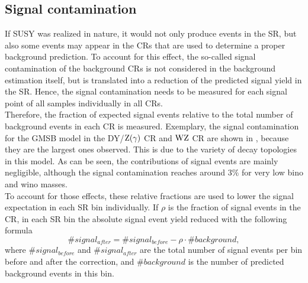 \subsection{Signal contamination}\label{sec:signalCont}
If SUSY was realized in nature, it would not only produce events in the SR, but also some events may appear in the CRs that are used to determine a proper background prediction. To account for this effect, the so-called signal contamination of the background CRs is not considered in the background estimation itself, but is translated into a reduction of the predicted signal yield in the SR. Hence, the signal contamination needs to be measured for each signal point of all samples individually in all CRs.\\
Therefore, the fraction of expected signal events relative to the total number of background events in each CR is measured.
Exemplary, the signal contamination for the GMSB model in the DY/$\mathrm{Z}(\gamma)$ CR and $\mathrm{W}\mathrm{Z}$ CR are shown in , because they are the largest ones observed. This is due to the variety of decay topologies in this model. As can be seen, the contributions of signal events are mainly negligible, although the signal contamination reaches around $3\%$ for very low bino and wino masses.\\
To account for those effects, these relative fractions are used to lower the signal expectation in each SR bin individually. If $\rho$ is the fraction of signal events in the CR, in each SR bin the absolute signal event yield reduced with the following formula
\begin{equation}
 \#signal_{after} = \#signal_{before} - \rho\cdot\#background,
\end{equation}
where $\#signal_{before}$ and $\#signal_{after}$ are the total number of signal events per bin before and after the correction, and $\#background$ is the number of predicted background events in this bin.


